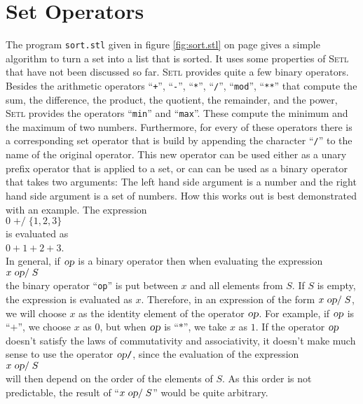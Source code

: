 \section{Set Operators}
The program \texttt{sort.stl}  given in figure \ref{fig:sort.stl} on page
\pageref{fig:sort.stl} gives a simple algorithm to turn a set into a list that is sorted.
It uses some properties of  \textsc{Setl} that have not been discussed so far.
 \textsc{Setl} provides quite a few binary operators.  Besides the arithmetic operators
``\texttt{+}'',
``\texttt{-}'',
``\texttt{*}'',
``\texttt{/}'',
``\texttt{mod}'',
``\texttt{**}'' that compute the sum, the difference, the product, the quotient, the remainder, and the
power,  \textsc{Setl} provides the operators 
``\texttt{min}'' and ``\texttt{max}''. These compute the minimum and the maximum of two
numbers.  Furthermore, for every of these operators there is a corresponding set operator
that is build by appending the character  ``\texttt{/}'' to the name of the original
operator.  This new operator can be used either as a unary prefix operator that is applied
to a set, or can can be used as a binary operator that takes two arguments: The left hand
side argument is a number and the right hand side argument is a set of numbers.  How this works out
is best demonstrated with an example.  The expression
\\[0.2cm]
\hspace*{1.3cm} $0\; \mathtt{+/}\; \{ 1, 2, 3 \}$ \\[0.2cm]
is evaluated as  \\[0.2cm]
\hspace*{1.3cm} $0 + 1 + 2 + 3$. \\[0.2cm]
In general, if $\textsl{op}$ is a binary operator then when evaluating the expression \\[0.2cm]
\hspace*{1.3cm} $x \;\textsl{op}\mathtt{/}\; S$ \\[0.2cm]
the binary  operator ``\texttt{op}'' is put between  $x$ and all elements from $S$.
If $S$ is empty, the expression is evaluated as $x$.    Therefore, in an expression of the
form  $x \;\textsl{op}\mathtt{/}\; S$, we will choose $x$ as the identity element of the
operator $\textsl{op}$.  For example, if $\textsl{op}$ is ``$\mathtt{+}$'', we choose $x$
as $0$, but when $\textsl{op}$ is ``$\mathtt{*}$'', we take $x$ as $1$.  If the operator
$\textsl{op}$ doesn't satisfy the laws of commutativity and associativity, it doesn't make
much sense to use the operator $\textsl{op}\texttt{/}$, since the evaluation of the expression
\\[0.2cm]
\hspace*{1.3cm}
\hspace*{1.3cm} $x \;\textsl{op}\mathtt{/}\; S$ \\[0.2cm]
will then depend on the order of the elements of $S$.  As this order is not predictable,
the result of  ``$x \;\textsl{op}\mathtt{/}\; S$'' would be quite arbitrary.

